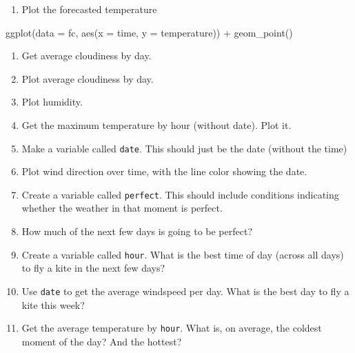 \documentclass[
]{book}
\newenvironment{Shaded}{\begin{snugshade}}{\end{snugshade}}
\newcommand{\AttributeTok}[1]{\textcolor[rgb]{0.77,0.63,0.00}{#1}}
\newcommand{\FunctionTok}[1]{\textcolor[rgb]{0.00,0.00,0.00}{#1}}
\newcommand{\NormalTok}[1]{#1}
\newcommand{\OtherTok}[1]{\textcolor[rgb]{0.56,0.35,0.01}{#1}}
\newcommand{\SpecialCharTok}[1]{\textcolor[rgb]{0.00,0.00,0.00}{#1}}
\newcommand{\StringTok}[1]{\textcolor[rgb]{0.31,0.60,0.02}{#1}}
\providecommand{\tightlist}{%
  \setlength{\itemsep}{0pt}\setlength{\parskip}{0pt}}
\begin{document}
\begin{Shaded}
\end{Shaded}

\begin{enumerate}
\def\labelenumi{\arabic{enumi}.}
\tightlist
\item
  Plot the forecasted temperature
\end{enumerate}

\begin{Shaded}
\begin{Highlighting}[]
\FunctionTok{ggplot}\NormalTok{(}\AttributeTok{data =}\NormalTok{ fc,}
       \FunctionTok{aes}\NormalTok{(}\AttributeTok{x =}\NormalTok{ time,}
           \AttributeTok{y =}\NormalTok{ temperature)) }\SpecialCharTok{+}
  \FunctionTok{geom\_point}\NormalTok{()}
\end{Highlighting}
\end{Shaded}

\begin{enumerate}
\def\labelenumi{\arabic{enumi}.}
\setcounter{enumi}{1}
\item
  Get average cloudiness by day.
\item
  Plot average cloudiness by day.
\item
  Plot humidity.
\item
  Get the maximum temperature by hour (without date). Plot it.
\item
  Make a variable called \texttt{date}. This should just be the date (without the time)
\item
  Plot wind direction over time, with the line color showing the date.
\item
  Create a variable called \texttt{perfect}. This should include conditions indicating whether the weather in that moment is perfect.
\item
  How much of the next few days is going to be perfect?
\item
  Create a variable called \texttt{hour}. What is the best time of day (across all days) to fly a kite in the next few days?
\item
  Use \texttt{date} to get the average windspeed per day. What is the best day to fly a kite this week?
\item
  Get the average temperature by \texttt{hour}. What is, on average, the coldest moment of the day? And the hottest?
\end{enumerate}
\end{document}
